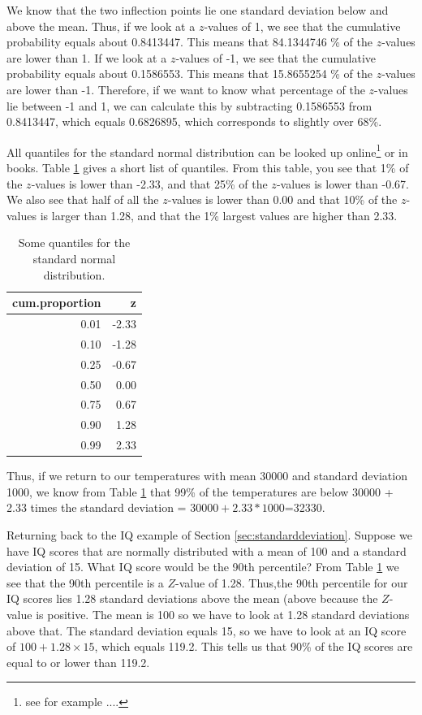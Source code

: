 \documentclass[]{report}\usepackage[]{graphicx}\usepackage[]{color}
\begin{document}
We know that the two inflection points lie one standard deviation below and above the mean. Thus, if we look at a $z$-values of 1, we see that the cumulative probability equals about 0.8413447. This means that 84.1344746 \% of the $z$-values are lower than 1. If we look at a $z$-values of -1, we see that the cumulative probability equals about 0.1586553. This means that 15.8655254 \% of the $z$-values are lower than -1. Therefore, if we want to know what percentage of the $z$-values lie between -1 and 1, we can calculate this by subtracting 0.1586553 from 0.8413447, which equals 0.6826895, which corresponds to slightly over 68\%.

All quantiles for the standard normal distribution can be looked up online\footnote{see for example ....} or in books. Table \ref{tab:normal_4} gives a short list of quantiles. From this table, you see that 1\% of the $z$-values is lower than -2.33, and that 25\% of the $z$-values is lower than -0.67. We also see that half of all the $z$-values is lower than 0.00 and that 10\% of the $z$-values is larger than 1.28, and that the 1\% largest values are higher than 2.33.

\begin{table}[ht]
\centering
\caption{Some quantiles for the standard normal distribution.} 
\label{tab:normal_4}
\begin{tabular}{rr}
  \hline
cum.proportion & z \\ 
  \hline
0.01 & -2.33 \\ 
  0.10 & -1.28 \\ 
  0.25 & -0.67 \\ 
  0.50 & 0.00 \\ 
  0.75 & 0.67 \\ 
  0.90 & 1.28 \\ 
  0.99 & 2.33 \\ 
   \hline
\end{tabular}
\end{table}



Thus, if we return to our temperatures with mean 30000 and standard deviation 1000, we know from Table \ref{tab:normal_4} that 99\% of the temperatures are below 30000 + 2.33 times the standard deviation =  $30000+2.33*1000$=32330.

Returning back to the IQ example of Section \ref{sec:standarddeviation}. Suppose we have IQ scores that are normally distributed with a mean of 100 and a standard deviation of 15. What IQ score would be the 90th percentile? From Table \ref{tab:normal_4} we see that the 90th percentile is a $Z$-value of 1.28. Thus,the 90th percentile for our IQ scores lies 1.28 standard deviations above the mean (above because the $Z$-value is positive. The mean is 100 so we have to look at 1.28 standard deviations above that. The standard deviation equals 15, so we have to look at an IQ score of $100 + 1.28 \times 15$, which equals 119.2. This tells us that 90\% of the IQ scores are equal to or lower than 119.2.
\end{document}
